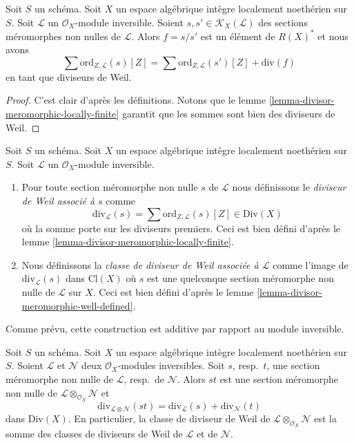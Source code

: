 \begin{lemma}
\label{lemma-divisor-meromorphic-well-defined}
Soit $S$ un schéma. Soit $X$ un espace algébrique intègre localement noethérien
sur $S$. Soit $\mathcal{L}$ un $\mathcal{O}_X$-module inversible.
Soient $s, s' \in \mathcal{K}_X(\mathcal{L})$ des sections méromorphes
non nulles de $\mathcal{L}$. Alors $f = s/s'$
est un élément de $R(X)^*$ et nous avons
$$
\sum \text{ord}_{Z, \mathcal{L}}(s)[Z]
=
\sum \text{ord}_{Z, \mathcal{L}}(s')[Z]
+
\text{div}(f)
$$
en tant que diviseurs de Weil.
\end{lemma}

\begin{proof}
C'est clair d'après les définitions.
Notons que le lemme \ref{lemma-divisor-meromorphic-locally-finite}
garantit que les sommes sont bien des diviseurs de Weil.
\end{proof}

\begin{definition}
\label{definition-divisor-invertible-sheaf}
Soit $S$ un schéma. Soit $X$ un espace algébrique intègre localement noethérien
sur $S$. Soit $\mathcal{L}$ un $\mathcal{O}_X$-module inversible.
\begin{enumerate}
\item Pour toute section méromorphe non nulle $s$ de $\mathcal{L}$
nous définissons le {\it diviseur de Weil associé à $s$} comme
$$
\text{div}_\mathcal{L}(s) =
\sum \text{ord}_{Z, \mathcal{L}}(s) [Z] \in \text{Div}(X)
$$
où la somme porte sur les diviseurs premiers. Ceci est bien défini d'après
le lemme \ref{lemma-divisor-meromorphic-locally-finite}.
\item Nous définissons la {\it classe de diviseur de Weil associée à $\mathcal{L}$}
comme l'image de $\text{div}_\mathcal{L}(s)$ dans $\text{Cl}(X)$
où $s$ est une quelconque section méromorphe non nulle de $\mathcal{L}$ sur $X$.
Ceci est bien défini d'après
le lemme \ref{lemma-divisor-meromorphic-well-defined}.
\end{enumerate}
\end{definition}

\noindent
Comme prévu, cette construction est additive par rapport au module inversible.

\begin{lemma}
\label{lemma-c1-additive}
Soit $S$ un schéma. Soit $X$ un espace algébrique intègre localement noethérien
sur $S$. Soient $\mathcal{L}$ et $\mathcal{N}$ deux $\mathcal{O}_X$-modules inversibles.
Soit $s$, resp.\ $t$, une section méromorphe non nulle de $\mathcal{L}$,
resp.\ de $\mathcal{N}$. Alors $st$ est une section méromorphe non nulle de
$\mathcal{L} \otimes_{\mathcal{O}_X} \mathcal{N}$ et
$$
\text{div}_{\mathcal{L} \otimes \mathcal{N}}(st)
=
\text{div}_\mathcal{L}(s) + \text{div}_\mathcal{N}(t)
$$
dans $\text{Div}(X)$. En particulier, la classe de diviseur de Weil de
$\mathcal{L} \otimes_{\mathcal{O}_X} \mathcal{N}$ est la somme
des classes de diviseurs de Weil de $\mathcal{L}$ et de $\mathcal{N}$.
\end{lemma}

